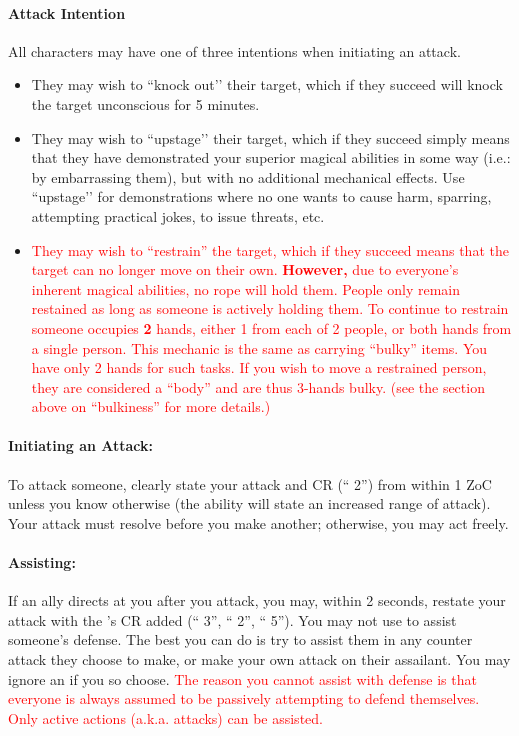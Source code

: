 \documentclass[sheet]{GL2020}
\begin{document}
\paragraph{Attack Intention} All characters may have one of three intentions when initiating an attack. 
\begin{itemize}
	\item They may wish to ``knock out'’ their target, which if they succeed will knock the target unconscious for 5 minutes. 
	\item They may wish to ``upstage'’ their target, which if they succeed simply means that they have demonstrated your superior magical abilities in some way (i.e.: by embarrassing them), but with no additional mechanical effects. Use ``upstage'’ for demonstrations where no one wants to cause harm, sparring, attempting practical jokes, to issue threats, etc. 
	\item \textcolor{red}{They may wish to ``restrain'' the target, which if they succeed means that the target can no longer move on their own. \textbf{However,} due to everyone's inherent magical abilities, no rope will hold them. People only remain restained as long as someone is actively holding them. To continue to restrain someone occupies \textbf{2} hands, either 1 from each of 2 people, or both hands from a single person. This mechanic is the same as carrying ``bulky'' items. You have only 2 hands for such tasks. If you wish to move a restrained person, they are considered a ``body'' and are thus 3-hands bulky. (see the section above on ``bulkiness'' for more details.)}
\end{itemize}

\paragraph{Initiating an Attack:} To attack someone, clearly state your attack and CR (``\aKnockOut{} 2'') from within 1 ZoC unless you know otherwise (the ability will state an increased range of attack). Your attack must resolve before you make another; otherwise, you may act freely. 

\paragraph{Assisting:} If an ally directs {\bf \aAssist{}} at you after you attack, you may, within 2 seconds, restate your attack with the \aAssist{}'s CR added (``\aKnockOut{} 3'', ``\aAssist{} 2'', ``\aKnockOut{} 5''). You may not use \aAssist{} to assist someone's defense. The best you can do is try to assist them in any counter attack they choose to make, or make your own attack on their assailant. You may ignore an \aAssist{} if you so choose. \textcolor{red}{The reason you cannot assist with defense is that everyone is always assumed to be passively attempting to defend themselves. Only active actions (a.k.a. attacks) can be assisted.}
\end{document}
